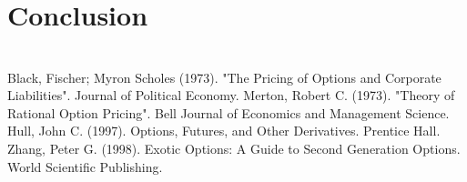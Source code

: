\documentclass{article}
\begin{document}
\section{Conclusion}


\newpage
\section*{} \label{bibsection}


\begin{thebibliography}{MMMMM} 
 Black, Fischer; Myron Scholes (1973). "The Pricing of Options and Corporate Liabilities". Journal of Political Economy.
 Merton, Robert C. (1973). "Theory of Rational Option Pricing". Bell Journal of Economics and Management Science.
 Hull, John C. (1997). Options, Futures, and Other Derivatives. Prentice Hall.
 Zhang, Peter G. (1998). Exotic Options: A Guide to Second Generation Options. World Scientific Publishing.

\end{thebibliography}


\end{document}
